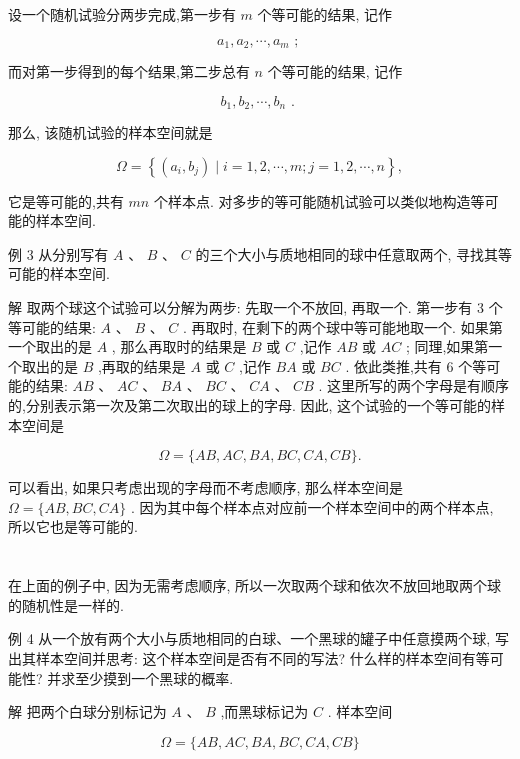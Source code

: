 \documentclass[10pt]{article}
\begin{document}
设一个随机试验分两步完成,第一步有 \(m\) 个等可能的结果, 记作

\[
{a}_{1},{a}_{2},\cdots ,{a}_{m}\text{ ; }
\]

而对第一步得到的每个结果,第二步总有 \(n\) 个等可能的结果, 记作

\[
{b}_{1},{b}_{2},\cdots ,{b}_{n}\text{ . }
\]

那么, 该随机试验的样本空间就是

\[
\Omega  = \left\{  {\left( {{a}_{i},{b}_{j}}\right)  \mid  i = 1,2,\cdots ,m;j = 1,2,\cdots ,n}\right\}  ,
\]

它是等可能的,共有 \({mn}\) 个样本点. 对多步的等可能随机试验可以类似地构造等可能的样本空间.

例 3 从分别写有 \(A\text{ 、 }B\text{ 、 }C\) 的三个大小与质地相同的球中任意取两个, 寻找其等可能的样本空间.

解 取两个球这个试验可以分解为两步: 先取一个不放回, 再取一个. 第一步有 3 个等可能的结果: \(A\text{ 、 }B\text{ 、 }C\) . 再取时, 在剩下的两个球中等可能地取一个. 如果第一个取出的是 \(A\) , 那么再取时的结果是 \(B\) 或 \(C\) ,记作 \({AB}\) 或 \({AC}\) ; 同理,如果第一个取出的是 \(B\) ,再取的结果是 \(A\) 或 \(C\) ,记作 \({BA}\) 或 \({BC}\) . 依此类推,共有 6 个等可能的结果: \({AB}\text{ 、 }{AC}\text{ 、 }{BA}\text{ 、 }{BC}\text{ 、 }{CA}\) 、 \({CB}\) . 这里所写的两个字母是有顺序的,分别表示第一次及第二次取出的球上的字母. 因此, 这个试验的一个等可能的样本空间是

\[
\Omega  = \{ {AB},{AC},{BA},{BC},{CA},{CB}\} .
\]

可以看出, 如果只考虑出现的字母而不考虑顺序, 那么样本空间是 \(\Omega  = \{ {AB},{BC},{CA}\}\) . 因为其中每个样本点对应前一个样本空间中的两个样本点, 所以它也是等可能的.

\section*{}



在上面的例子中, 因为无需考虑顺序, 所以一次取两个球和依次不放回地取两个球的随机性是一样的.

例 4 从一个放有两个大小与质地相同的白球、一个黑球的罐子中任意摸两个球, 写出其样本空间并思考: 这个样本空间是否有不同的写法? 什么样的样本空间有等可能性? 并求至少摸到一个黑球的概率.

解 把两个白球分别标记为 \(A\text{ 、 }B\) ,而黑球标记为 \(C\) . 样本空间

\[
\Omega  = \{ {AB},{AC},{BA},{BC},{CA},{CB}\}
\]
\end{document}
